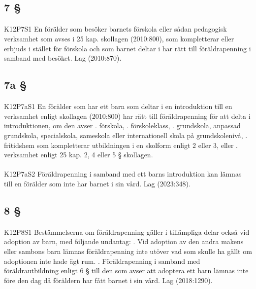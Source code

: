\documentclass[a4paper,notitlepage,openany,10pt]{book}
\begin{document}
\subsection*{7 §}
\paragraph*{}
{\tiny K12P7S1}
En förälder som besöker barnets förskola eller sådan pedagogisk verksamhet som avses i 25 kap. skollagen (2010:800), som kompletterar eller erbjuds i stället för förskola och som barnet deltar i har rätt till föräldrapenning i samband med besöket.
Lag (2010:870).
\subsection*{7a §}
\paragraph*{}
{\tiny K12P7aS1}
En förälder som har ett barn som deltar i en introduktion till en verksamhet enligt skollagen (2010:800) har rätt till föräldrapenning för att delta i introduktionen, om den avser
. förskola,
. förskoleklass,
. grundskola, anpassad grundskola, specialskola, sameskola eller internationell skola på grundskolenivå,
. fritidshem som kompletterar utbildningen i en skolform enligt 2 eller 3, eller
. verksamhet enligt 25 kap. 2, 4 eller 5 § skollagen.
\paragraph*{}
{\tiny K12P7aS2}
Föräldrapenning i samband med ett barns introduktion kan lämnas till en förälder som inte har barnet i sin vård.
Lag (2023:348).
\subsection*{8 §}
\paragraph*{}
{\tiny K12P8S1}
Bestämmelserna om föräldrapenning gäller i tillämpliga delar också vid adoption av barn, med följande undantag:
. Vid adoption av den andra makens eller sambons barn lämnas föräldrapenning inte utöver vad som skulle ha gällt om adoptionen inte hade ägt rum.
. Föräldrapenning i samband med föräldrautbildning enligt 6 § till den som avser att adoptera ett barn lämnas inte före den dag då föräldern har fått barnet i sin vård.
Lag (2018:1290).
\end{document}
